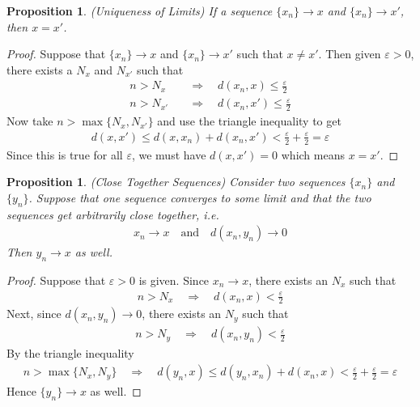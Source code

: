 \documentclass[12pt]{article}
\numberwithin{equation}{section} %
\theoremstyle{plain}
\newtheorem{prop}[thm]{Proposition}
\theoremstyle{definition}
\theoremstyle{remark}
\begin{document}
\begin{prop}{\emph{(Uniqueness of Limits)}}
If a sequence $\{x_n\}\rightarrow x$ and $\{x_n\}\rightarrow x'$,
then $x=x'$.
\end{prop}
\begin{proof}
Suppose that $\{x_n\}\rightarrow x$ and $\{x_n\} \rightarrow x'$ such
that $x\neq x'$. Then given $\varepsilon>0$, there exists a $N_x$ and
$N_{x'}$ such that
\begin{align*}
  n > N_x
  &\quad\Rightarrow\quad
  d(x_n,x) \leq \frac{\varepsilon}{2} \\
  n > N_{x'}
  &\quad\Rightarrow\quad
  d(x_n,x') \leq \frac{\varepsilon}{2}
\end{align*}
Now take $n>\max\{N_x, N_{x'}\}$ and use the triangle inequality to get
\begin{align*}
  d(x,x') \leq d(x,x_n) + d(x_n, x')
  < \frac{\varepsilon}{2} + \frac{\varepsilon}{2} = \varepsilon
\end{align*}
Since this is true for all $\varepsilon$, we must have $d(x,x')=0$ which
means $x=x'$.
\end{proof}

\begin{prop}{\emph{(Close Together Sequences)}}
Consider two sequences $\{x_n\}$ and $\{y_n\}$.
Suppose that one sequence converges to some limit and that the two
sequences get arbitrarily close together, i.e.
\begin{align*}
  x_n\rightarrow x
  \quad\text{and}\quad
  d(x_n,y_n)\rightarrow 0
\end{align*}
Then $y_n\rightarrow x$ as well.
\end{prop}
\begin{proof}
Suppose that $\varepsilon>0$ is given. Since $x_n\rightarrow x$, there
exists an $N_x$ such that
\begin{align*}
  n > N_x
  \quad\Rightarrow\quad
  d(x_n,x) < \frac{\varepsilon}{2}
\end{align*}
Next, since $d(x_n,y_n)\rightarrow 0$, there exists an $N_y$ such that
\begin{align*}
  n > N_y
  \quad\Rightarrow\quad
  d(x_n,y_n) < \frac{\varepsilon}{2}
\end{align*}
By the triangle inequality
\begin{align*}
  n>\max\{N_x,N_y\}
  \quad\Rightarrow\quad
  d(y_n,x) \leq
  d(y_n,x_n) + d(x_n,x)
  < \frac{\varepsilon}{2} + \frac{\varepsilon}{2} = \varepsilon
\end{align*}
Hence $\{y_n\}\rightarrow x$ as well.

\end{proof}
\end{document}

